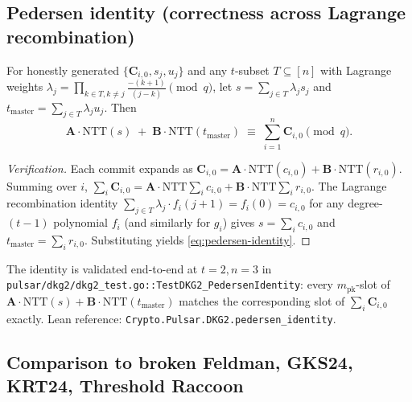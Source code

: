\subsection{Pedersen identity (correctness across Lagrange recombination)}
\label{ssec:pedersen-identity}

\begin{theorem}
\label{thm:pedersen-identity}
For honestly generated $\{\mathbf{C}_{i,0}, s_j, u_j\}$ and any
$t$-subset $T\subseteq[n]$ with Lagrange weights
$\lambda_j = \prod_{k\in T,k\ne j}\frac{-(k+1)}{(j-k)}\pmod q$,
let $s = \sum_{j\in T}\lambda_j s_j$ and
$t_{\mathrm{master}} = \sum_{j\in T}\lambda_j u_j$. Then
\begin{equation}
\label{eq:pedersen-identity}
\mathbf{A}\cdot\mathrm{NTT}(s) \;+\; \mathbf{B}\cdot\mathrm{NTT}(t_{\mathrm{master}})
\;\equiv\; \sum_{i=1}^{n}\mathbf{C}_{i,0} \pmod q.
\end{equation}
\end{theorem}

\begin{proof}[Verification]
Each commit expands as
$\mathbf{C}_{i,0} = \mathbf{A}\cdot\mathrm{NTT}(c_{i,0})+\mathbf{B}\cdot\mathrm{NTT}(r_{i,0})$.
Summing over $i$,
\(
\sum_i\mathbf{C}_{i,0}
= \mathbf{A}\cdot\mathrm{NTT}\!\sum_i c_{i,0} + \mathbf{B}\cdot\mathrm{NTT}\!\sum_i r_{i,0}.
\)
The Lagrange recombination identity
$\sum_{j\in T}\lambda_j\cdot f_i(j+1) = f_i(0) = c_{i,0}$ for any
degree-$(t-1)$ polynomial $f_i$ (and similarly for $g_i$) gives
$s = \sum_i c_{i,0}$ and $t_{\mathrm{master}} = \sum_i r_{i,0}$.
Substituting yields \eqref{eq:pedersen-identity}.
\end{proof}

The identity is validated end-to-end at $t=2,n=3$ in
\texttt{pulsar/dkg2/dkg2\_test.go::TestDKG2\_PedersenIdentity}: every
$m_{\textrm{pk}}$-slot of $\mathbf{A}\cdot\mathrm{NTT}(s)+\mathbf{B}\cdot\mathrm{NTT}(t_{\mathrm{master}})$
matches the corresponding slot of $\sum_i\mathbf{C}_{i,0}$ exactly.
Lean reference: \texttt{Crypto.Pulsar.DKG2.pedersen\_identity}.

\subsection{Comparison to broken Feldman, GKS24, KRT24, Threshold Raccoon}
\label{ssec:pedersen-compare}

